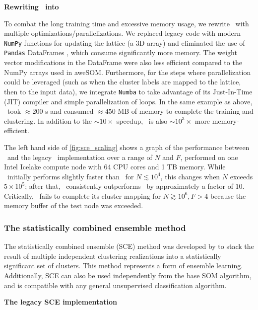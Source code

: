 \centerline{\textbf{Rewriting \popsom\ into \awesom}}

To combat the long training time and excessive memory usage, we rewrite \popsom\ with multiple optimizations/parallelizations.
We replaced legacy code with modern \texttt{NumPy} functions for updating the lattice (a 3D array) and eliminated the use of \texttt{Pandas} DataFrames \citep{the_pandas_development_team_pandas-devpandas_2024}, which consume significantly more memory. The weight vector modifications in the DataFrame were also less efficient compared to the NumPy arrays used in aweSOM\@.
Furthermore, for the steps where parallelization could be leveraged (such as when the cluster labels are mapped to the lattice, then to the input data), we integrate \texttt{Numba} \citep{lam_numba_2015} to take advantage of its Just-In-Time (JIT) compiler and simple parallelization of loops. In the same example as above, \awesom\ took $\approx 200$ s and consumed $\approx 450$ MB of memory to complete the training and clustering. In addition to the $\sim 10 \times$ speedup, \awesom\ is also $\sim 10^3 \times$ more memory-efficient.

The left hand side of \autoref{fig:sce_scaling} shows a graph of the performance between \awesom\ and the legacy \popsom\ implementation over a range of $N$ and $F$, performed on one Intel Icelake compute node with 64 CPU cores and 1 TB memory.
While \popsom\ initially performs slightly faster than \awesom\ for $N \lesssim 10^4$, this changes when $N$ exceeds $5 \times 10^5$; after that, \awesom\ consistently outperforms \popsom\ by approximately a factor of $10$.
Critically, \popsom\ fails to complete its cluster mapping for $N \gtrsim 10^6, F > 4$ because the memory buffer of the test node was exceeded.

\subsubsection{The statistically combined ensemble method}

The statistically combined ensemble (SCE) method was developed by \citet{bussov_maarja_segmentation_2021} to stack the result of multiple independent clustering realizations into a statistically significant set of clusters. This method represents a form of ensemble learning. Additionally, SCE can also be used independently from the base SOM algorithm, and is compatible with any general unsupervised classification algorithm.

\centerline{\textbf{The legacy SCE implementation}}

